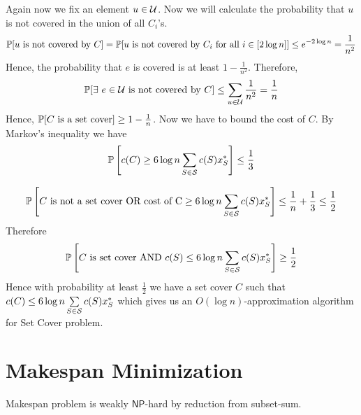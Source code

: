 Again now we fix an element $u\in \mathcal{U}$. Now we will calculate the probability that $u$ is not covered in the union of all $C_i$'s. $$\mathbb{P}[u \text{ is not covered by }C]=\mathbb{P}[u \text{ is not covered by }C_i\text{ for all }i\in [2\log n]]\leq e^{-2\log n}=\frac{1}{n^2}$$
Hence, the probability that $e$ is covered is at least $1-\frac{1}{n^2}$. Therefore, $$\mathbb{P}[\exists\ e\in\mathcal{U}\text{ is not covered by }C]\leq \sum\limits_{u\in\mathcal{U}}\frac1{n^2}=\frac1n$$Hence, $\mathbb{P}[C\text{ is a set cover}]\geq 1-\frac1n$. Now we have to bound the cost of $C$. By Markov's inequality we have $$\mathbb{P}\left[c(C)\geq 6\log n\sum\limits_{S\in\mathcal{S}}c(S)x^*_S\right]\leq \frac13$$

$$\mathbb{P}\left[C\text{ is not a set cover OR cost of C}\geq 6\log n\sum\limits_{S\in\mathcal{S}}c(S)x^*_S\right]\leq \frac1n+\frac13\leq \frac12$$Therefore $$\mathbb{P}\left[C\text{ is  set cover AND }c(S)\leq 6\log n\sum\limits_{S\in\mathcal{S}}c(S)x^*_S\right]\geq \frac12$$Hence with probability at least $\frac12$ we have a set cover $C$ such that $c(C)\leq 6\log n\sum\limits_{S\in\mathcal{S}}c(S)x^*_S$ which gives us an $O(\log n)$-approximation algorithm for Set Cover problem.\parinn




\newpage

\section{Makespan Minimization}
\begin{algoprob}
\end{algoprob} 
\begin{Theorem}{}{}
    Makespan problem is weakly $\mathsf{NP}$-hard by reduction from subset-sum.
\end{Theorem}

